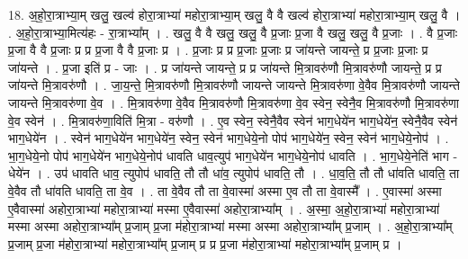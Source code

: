 \documentclass[17pt]{extarticle}
\begin{document}
18. अ॒हो॒रा॒त्राभ्या॒म् खलु॒ खल्व॑ होरा॒त्राभ्या॑ महोरा॒त्राभ्या॒म् खलु॒ वै वै खल्व॑ होरा॒त्राभ्या॑ महोरा॒त्राभ्या॒म् खलु॒ वै । . अ॒हो॒रा॒त्राभ्या॒मित्य॑हः - रा॒त्राभ्या᳚म् । . खलु॒ वै वै खलु॒ खलु॒ वै प्र॒जाः प्र॒जा वै खलु॒ खलु॒ वै प्र॒जाः । . वै प्र॒जाः प्र॒जा वै वै प्र॒जाः प्र प्र प्र॒जा वै वै प्र॒जाः प्र । . प्र॒जाः प्र प्र प्र॒जाः प्र॒जाः प्र जा॑यन्ते जायन्ते॒ प्र प्र॒जाः प्र॒जाः प्र जा॑यन्ते । . प्र॒जा इति॑ प्र - जाः । . प्र जा॑यन्ते जायन्ते॒ प्र प्र जा॑यन्ते मि॒त्रावरु॑णौ मि॒त्रावरु॑णौ जायन्ते॒ प्र प्र जा॑यन्ते मि॒त्रावरु॑णौ । . जा॒य॒न्ते॒ मि॒त्रावरु॑णौ मि॒त्रावरु॑णौ जायन्ते जायन्ते मि॒त्रावरु॑णा वे॒वैव मि॒त्रावरु॑णौ जायन्ते जायन्ते मि॒त्रावरु॑णा वे॒व । . मि॒त्रावरु॑णा वे॒वैव मि॒त्रावरु॑णौ मि॒त्रावरु॑णा वे॒व स्वेन॒ स्वेनै॒व मि॒त्रावरु॑णौ मि॒त्रावरु॑णा वे॒व स्वेन॑ । . मि॒त्रावरु॑णा॒विति॑ मि॒त्रा - वरु॑णौ । . ए॒व स्वेन॒ स्वेनै॒वैव स्वेन॑ भाग॒धेये॑न भाग॒धेये॑न॒ स्वेनै॒वैव स्वेन॑ भाग॒धेये॑न । . स्वेन॑ भाग॒धेये॑न भाग॒धेये॑न॒ स्वेन॒ स्वेन॑ भाग॒धेये॒नो पोप॑ भाग॒धेये॑न॒ स्वेन॒ स्वेन॑ भाग॒धेये॒नोप॑ । . भा॒ग॒धेये॒नो पोप॑ भाग॒धेये॑न भाग॒धेये॒नोप॑ धावति धाव॒त्युप॑ भाग॒धेये॑न भाग॒धेये॒नोप॑ धावति । . भा॒ग॒धेये॒नेति॑ भाग - धेये॑न । . उप॑ धावति धाव॒ त्युपोप॑ धावति॒ तौ तौ धा॑व॒ त्युपोप॑ धावति॒ तौ । . धा॒व॒ति॒ तौ तौ धा॑वति धावति॒ ता वे॒वैव तौ धा॑वति धावति॒ ता वे॒व । . ता वे॒वैव तौ ता वे॒वास्मा॑ अस्मा ए॒व तौ ता वे॒वास्मै᳚ । . ए॒वास्मा॑ अस्मा ए॒वैवास्मा॑ अहोरा॒त्राभ्या॑ महोरा॒त्राभ्या॑ मस्मा ए॒वैवास्मा॑ अहोरा॒त्राभ्या᳚म् । . अ॒स्मा॒ अ॒हो॒रा॒त्राभ्या॑ महोरा॒त्राभ्या॑ मस्मा अस्मा अहोरा॒त्राभ्या᳚म् प्र॒जाम् प्र॒जा म॑होरा॒त्राभ्या॑ मस्मा अस्मा अहोरा॒त्राभ्या᳚म् प्र॒जाम् । . अ॒हो॒रा॒त्राभ्या᳚म् प्र॒जाम् प्र॒जा म॑होरा॒त्राभ्या॑ महोरा॒त्राभ्या᳚म् प्र॒जाम् प्र प्र प्र॒जा म॑होरा॒त्राभ्या॑ महोरा॒त्राभ्या᳚म् प्र॒जाम् प्र । \newline
\end{document}
